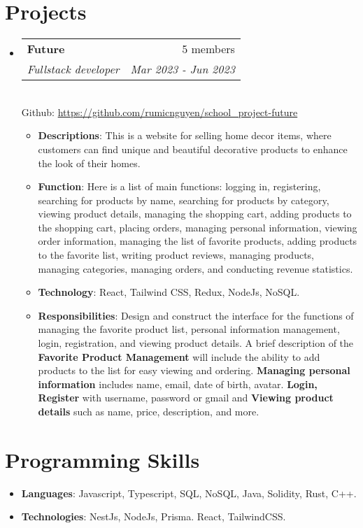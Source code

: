 \documentclass[letterpaper,11pt]{article}
\makeatletter
\newcommand{\resumeItem}[2]{
  \item\small{
    \textbf{#1}{: #2 \vspace{-2pt}}
  }
}
\newcommand{\resumeSubheading}[4]{
  \vspace{-1pt}\item
    \begin{tabular*}{0.97\textwidth}{l@{\extracolsep{\fill}}r}
      \textbf{#1} & #2 \\
      \textit{\small#3} & \textit{\small #4} \\
    \end{tabular*}\vspace{-5pt}
}
\newcommand{\resumeSubItem}[2]{\resumeItem{#1}{#2}\vspace{-4pt}}
\newcommand{\resumeSubHeadingListStart}{\begin{itemize}[leftmargin=*]}
\newcommand{\resumeSubHeadingListEnd}{\end{itemize}}
\newcommand{\resumeItemListStart}{\begin{itemize}}
\newcommand{\resumeItemListEnd}{\end{itemize}\vspace{-5pt}}
\makeatother
\begin{document}



\section{Projects}
\resumeSubHeadingListStart
\resumeSubheading
{Future}{5 members}
{Fullstack developer}{Mar 2023 - Jun 2023}\\
\vspace{2mm}
{Github: \href{https://github.com/rumicnguyen/school_project-future}{https://github.com/rumicnguyen/school\_project-future}}

\vspace{0.5mm}
\resumeItemListStart
\resumeItem{Descriptions}
{This is a website for selling home decor items, where customers can find unique and beautiful decorative products to enhance the look of their homes.}

\resumeItem{Function}
{Here is a list of main functions: logging in, registering, searching for products by name, searching for products by category, viewing product details, managing the shopping cart, 
adding products to the shopping cart, placing orders, managing personal information, viewing order information, managing the list of favorite products, adding products to the favorite list, writing product reviews, managing products, managing categories, managing orders, and conducting revenue statistics.}
\resumeItem{Technology}
{React, Tailwind CSS, Redux, NodeJs, NoSQL.}
\resumeItem{Responsibilities}
{Design and construct the interface for the functions of managing the favorite product list, personal information management, login, registration, and viewing product details.
A brief description of the \textbf{Favorite Product Management} will include the ability to add products to the list for easy viewing and ordering. 
\textbf{Managing personal information} includes name, email, date of birth, avatar. 
\textbf{Login, Register} with username, password or gmail and \textbf{Viewing product details} such as name, price, description, and more.}
\resumeItemListEnd
\resumeSubHeadingListEnd

\section{Programming Skills}
\resumeSubHeadingListStart
\resumeSubItem{Languages}
{Javascript, Typescript, SQL, NoSQL, Java, Solidity, Rust, C++.}

\resumeSubItem{Technologies}
{NestJs, NodeJs, Prisma. React, TailwindCSS.}

\resumeSubHeadingListEnd


\end{document}
